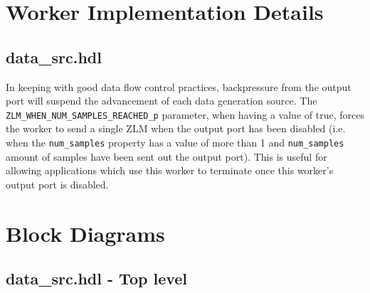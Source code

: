 \documentclass{article}
\def\comp{data\_src}
\def\Comp{TEMP}
\def\Comp{Data\_Src }
\begin{document}
\section*{Worker Implementation Details}
\begin{flushleft}
\subsection*{\comp.hdl}
\justify
  In keeping with good data flow control practices, backpressure from the output port will suspend the advancement of each data generation source. The \verb+ZLM_WHEN_NUM_SAMPLES_REACHED_p+ parameter, when having a value of true, forces the worker to send a single ZLM when the output port has been disabled (i.e. when the \verb+num_samples+ property has a value of more than 1 and \verb+num_samples+ amount of samples have been sent out the output port). This is useful for allowing applications which use this worker to terminate once this worker's output port is disabled.
\end{flushleft}

\section*{Block Diagrams}
\subsection*{\comp.hdl - Top level}
\begin{center}
\end{center}\pagebreak
\end{document}
